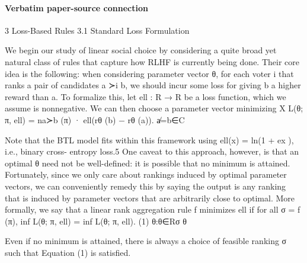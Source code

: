 \documentclass[10pt]{article}
\begin{document}
\paragraph{Verbatim paper-source connection}
\begin{ReviewVerbatim}
3         Loss-Based Rules
3.1       Standard Loss Formulation

We begin our study of linear social choice by considering a quite broad yet natural class of rules
that capture how RLHF is currently being done. Their core idea is the following: when considering
parameter vector θ, for each voter i that ranks a pair of candidates a ≻i b, we should incur some
loss for giving b a higher reward than a. To formalize this, let ell : R → R be a loss function, which
we assume is nonnegative. We can then choose a parameter vector minimizing
                                         X
                           L(θ; π, ell) =       na≻b (π) · ell(rθ (b) − rθ (a)).
                                             a̸=b∈C

Note that the BTL model fits within this framework using ell(x) = ln(1 + ex ), i.e., binary cross-
entropy loss.5 One caveat to this approach, however, is that an optimal θ need not be well-defined:
it is possible that no minimum is attained. Fortunately, since we only care about rankings induced
by optimal parameter vectors, we can conveniently remedy this by saying the output is any ranking
that is induced by parameter vectors that are arbitrarily close to optimal. More formally, we say that
a linear rank aggregation rule f minimizes ell if for all σ = f (π),
                                       inf L(θ; π, ell) = inf L(θ; π, ell).                                       (1)
                                     θ:θ∈Rσ                    θ

Even if no minimum is attained, there is always a choice of feasible ranking σ such that Equation (1)
is satisfied.
\end{ReviewVerbatim}
\end{document}
